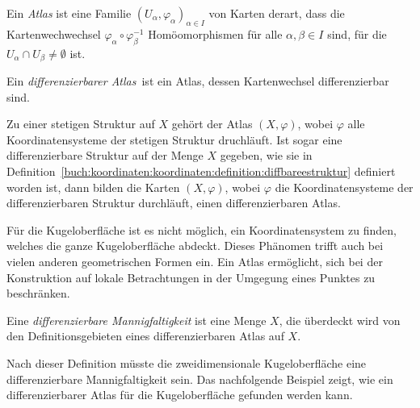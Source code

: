 \begin{definition}[Atlas]
Ein {\em Atlas} ist eine Familie $(U_\alpha,\varphi_\alpha)_{\alpha\in I}$
von Karten derart, dass die Kartenwechwechsel
$\varphi_\alpha\circ\varphi_\beta^{-1}$ Homöomorphismen
für alle $\alpha,\beta\in I$ sind, für die
$U_\alpha\cap U_\beta\ne \emptyset$ ist.
\end{definition}

\begin{definition}
Ein {\em differenzierbarer Atlas} ist ein Atlas, dessen
Kartenwechsel differenzierbar sind.
\end{definition}

Zu einer stetigen Struktur auf $X$ gehört der Atlas $(X,\varphi)$,
wobei $\varphi$ alle Koordinatensysteme der stetigen Struktur druchläuft.
Ist sogar eine differenzierbare Struktur auf der Menge $X$ gegeben,
wie sie in
Definition~\ref{buch:koordinaten:koordinaten:definition:diffbareestruktur}
definiert worden ist, dann bilden die Karten $(X,\varphi)$, wobei
$\varphi$ die Koordinatensysteme der differenzierbaren Struktur
durchläuft, einen differenzierbaren Atlas.

Für die Kugeloberfläche ist es nicht möglich, ein Koordinatensystem
zu finden, welches die ganze Kugeloberfläche abdeckt.
Dieses Phänomen trifft auch bei vielen anderen geometrischen Formen ein.
Ein Atlas ermöglicht, sich bei der Konstruktion auf lokale Betrachtungen
in der Umgegung eines Punktes zu beschränken.

\begin{definition}
Eine {\em differenzierbare Mannigfaltigkeit} ist eine Menge $X$, die überdeckt
wird von den Definitionsgebieten eines differenzierbaren Atlas auf $X$.
%
%
\end{definition}

Nach dieser Definition müsste die zweidimensionale Kugeloberfläche eine
differenzierbare Mannigfaltigkeit sein.
Das nachfolgende Beispiel zeigt, wie ein differenzierbarer Atlas
für die Kugeloberfläche gefunden werden kann.

